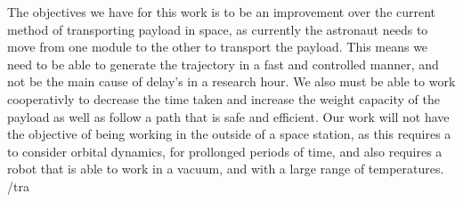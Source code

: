 The objectives we have for this work is to be an improvement over the current method of transporting payload in space, as currently the astronaut needs to move from one module to the other to transport the payload. This means we need to be able to generate the trajectory in a fast and controlled manner, and not be the main cause of delay's in a research hour. We also must be able to work cooperativly to decrease the time taken and increase the weight capacity of the payload as well as follow a path that is safe and efficient. Our work will not have the objective of being working in the outside of a space station, as this requires a to consider orbital dynamics, for prollonged periods of time, and also requires a robot that is able to work in a vacuum, and with a large range of temperatures. /tra